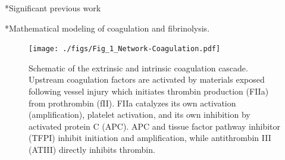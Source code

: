 \documentclass[11pt]{article}
\makeatletter
\renewcommand\subsection{\@startsection
	{subsection}{2}{0mm}
	{-0.05in}
	{-0.5\baselineskip}
	{\normalfont\normalsize\bfseries}}
\renewcommand\section{\@startsection
	{subsection}{2}{0mm}
	{-0.2in}
	{0.05\baselineskip}
	{\normalfont\large\bfseries}}
\makeatother
\begin{document}
\section*{Significant previous work}
\subsection*{Mathematical modeling of coagulation and fibrinolysis.}
\begin{figure}
  \texttt{[image: ./figs/Fig\_1\_Network-Coagulation.pdf]}
  \caption{Schematic of the extrinsic and intrinsic coagulation cascade.
  Upstream coagulation factors are activated by materials exposed following vessel injury which initiates thrombin production (FIIa) from prothrombin (fII).
  FIIa catalyzes its own activation (amplification), platelet activation, and its own inhibition by activated protein C (APC).
  APC and tissue factor pathway inhibitor (TFPI) inhibit initiation and amplification, while antithrombin III (ATIII) directly inhibits thrombin. }\label{fig:fig-coagulation}
\end{figure}
\end{document}
